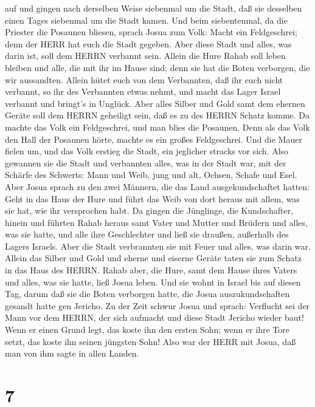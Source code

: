 auf und gingen nach derselben Weise siebenmal um die Stadt, daß sie
desselben einen Tages siebenmal um die Stadt kamen.  Und
beim siebentenmal, da die Priester die Posaunen bliesen, sprach Josua
zum Volk: Macht ein Feldgeschrei; denn der HERR hat euch die Stadt
gegeben.  Aber diese Stadt und alles, was darin ist, soll
dem HERRN verbannt sein. Allein die Hure Rahab soll leben bleiben und
alle, die mit ihr im Hause sind; denn sie hat die Boten verborgen, die
wir aussandten.  Allein hütet euch von dem Verbannten, daß
ihr euch nicht verbannt, so ihr des Verbannten etwas nehmt, und macht
das Lager Israel verbannt und bringt's in Unglück.  Aber
alles Silber und Gold samt dem ehernen Geräte soll dem HERRN geheiligt
sein, daß es zu des HERRN Schatz komme.  Da machte das Volk
ein Feldgeschrei, und man blies die Posaunen. Denn als das Volk den Hall
der Posaunen hörte, machte es ein großes Feldgeschrei. Und die Mauer
fielen um, und das Volk erstieg die Stadt, ein jeglicher stracks vor
sich. Also gewannen sie die Stadt  und verbannten alles,
was in der Stadt war, mit der Schärfe des Schwerts: Mann und Weib, jung
und alt, Ochsen, Schafe und Esel.  Aber Josua sprach zu den
zwei Männern, die das Land ausgekundschaftet hatten: Geht in das Haus
der Hure und führt das Weib von dort heraus mit allem, was sie hat, wie
ihr versprochen habt.  Da gingen die Jünglinge, die
Kundschafter, hinein und führten Rahab heraus samt Vater und Mutter und
Brüdern und alles, was sie hatte, und alle ihre Geschlechter und ließ
sie draußen, außerhalb des Lagers Israels.  Aber die Stadt
verbrannten sie mit Feuer und alles, was darin war. Allein das Silber
und Gold und eherne und eiserne Geräte taten sie zum Schatz in das Haus
des HERRN.  Rahab aber, die Hure, samt dem Hause ihres
Vaters und alles, was sie hatte, ließ Josua leben. Und sie wohnt in
Israel bis auf diesen Tag, darum daß sie die Boten verborgen hatte, die
Josua auszukundschaften gesandt hatte gen Jericho.  Zu der
Zeit schwur Josua und sprach: Verflucht sei der Mann vor dem HERRN, der
sich aufmacht und diese Stadt Jericho wieder baut! Wenn er einen Grund
legt, das koste ihn den ersten Sohn; wenn er ihre Tore setzt, das koste
ihn seinen jüngsten Sohn!  Also war der HERR mit Josua, daß
man von ihm sagte in allen Landen.

\hypertarget{section-6}{%
\section{7}\label{section-6}}

